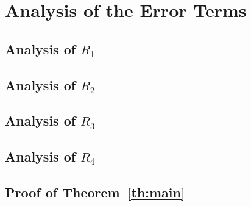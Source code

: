 \section{Analysis of the Error Terms}
  \subsection{Analysis of $R_1$}
    
  \subsection{Analysis of $R_2$}
    
  \subsection{Analysis of $R_3$}
    
  \subsection{Analysis of $R_4$}
    
  \subsection{Proof of Theorem~\ref{th:main}}
    
